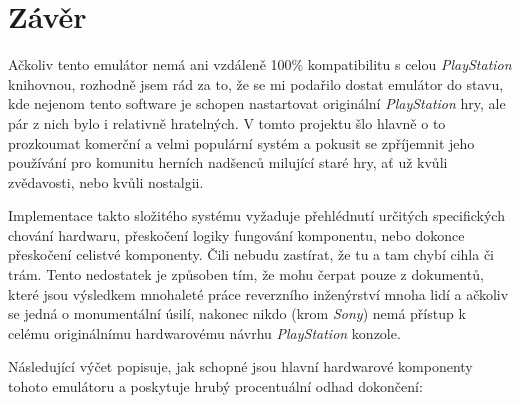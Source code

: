 \chapter{Závěr}

Ačkoliv tento emulátor nemá ani vzdáleně 100\% kompatibilitu s celou \textit{PlayStation} knihovnou, rozhodně jsem rád za to, 
že se mi podařilo dostat emulátor do stavu, kde nejenom tento software je schopen nastartovat originální \textit{PlayStation} hry,
ale pár z nich bylo i relativně hratelných. V tomto projektu šlo hlavně o to prozkoumat
komerční a velmi populární systém a pokusit se zpříjemnit jeho používání pro komunitu herních nadšenců milující staré hry, 
ať už kvůli zvědavosti, nebo kvůli nostalgii.

Implementace takto složitého systému vyžaduje přehlédnutí určitých specifických chování hardwaru, přeskočení logiky fungování
komponentu, nebo dokonce přeskočení celistvé komponenty. Čili nebudu zastírat, že tu a tam chybí cihla či trám. Tento nedostatek
je způsoben tím, že mohu čerpat pouze z dokumentů, které jsou výsledkem mnohaleté práce reverzního
inženýrství mnoha lidí a ačkoliv se jedná o monumentální úsilí, nakonec nikdo (krom \textit{Sony}) nemá přístup k celému originálnímu
hardwarovému návrhu \textit{PlayStation} konzole. 

Následující výčet popisuje, jak schopné jsou hlavní hardwarové komponenty tohoto emulátoru a poskytuje hrubý procentuální odhad dokončení:

